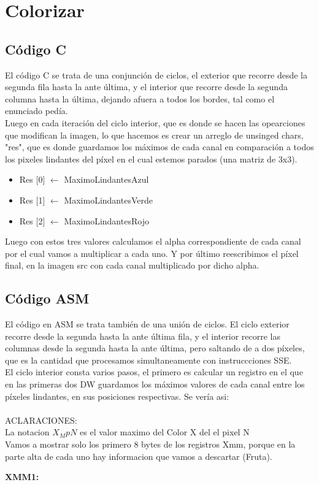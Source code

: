 \section{Colorizar}

\subsection{Código C}
	El código C se trata de una conjunción de ciclos, el exterior que recorre desde la segunda fila hasta la ante última,  y el interior que recorre desde la segunda columna hasta la última, dejando afuera a todos los bordes, tal como el enunciado pedía. \\ Luego en cada iteración del ciclo interior, que es donde se hacen las opearciones que modifican la imagen, lo que hacemos es crear un arreglo de unsinged chars, "res", que es  donde guardamos los máximos de cada canal en comparación a todos  los pixeles lindantes del píxel en el cual estemos parados (una matriz de 3x3).
\begin{itemize}
\item {Res $[$0$]$ $\leftarrow$ MaximoLindantesAzul}
\item {Res $[$1$]$ $\leftarrow$ MaximoLindantesVerde}
\item {Res $[$2$]$ $\leftarrow$ MaximoLindantesRojo}
\end{itemize}
Luego con estos tres valores calculamos el alpha correspondiente de cada canal por el cual vamos a multiplicar a cada uno. Y por último reescribimos el píxel final, en la imagen src con cada canal multiplicado por dicho alpha.

\subsection{Código ASM}

	El código en ASM se trata también de una unión de ciclos. El ciclo exterior recorre desde la segunda hasta la ante última fila, y el interior recorre las columnas desde la segunda hasta la ante última, pero saltando de a dos píxeles, que es la cantidad que procesamos simultaneamente con instruccciones SSE. \\
	El ciclo interior consta varios pasos, el primero es calcular un registro en el que en las primeras dos DW guardamos los máximos valores de cada canal entre los píxeles lindantes, en sus posiciones respectivas. Se vería asi:\\
\\ACLARACIONES: 
\\ \hspace{3cm} La notacion $X_M{pN}$ es el valor maximo del Color X del el pixel N
\\ \hspace{3cm} Vamos a mostrar solo los primero 8 bytes de los registros Xmm, porque en la parte alta de cada uno hay informacion que vamos a descartar (Fruta).
\par{\textbf{XMM1:}}
	
